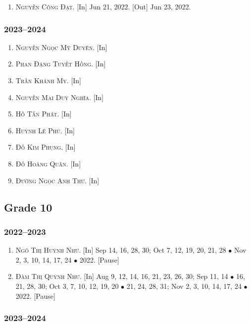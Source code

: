 \documentclass{article}
\begin{document}
\begin{enumerate}
	\item \textsc{Nguyễn Công Đạt.} \textsf{[In]} Jun 21, 2022. \textsf{[Out]} Jun 23, 2022.
\end{enumerate}

\subsubsection{2023--2024}

\begin{enumerate}
	\item \textsc{Nguyễn Ngọc Mỹ Duyên.} \textsf{[In]} 
	\item \textsc{Phan Đặng Tuyết Hồng.} \textsf{[In]} 
	\item \textsc{Trần Khánh My.} \textsf{[In]} 
	\item \textsc{Nguyễn Mai Duy Nghĩa.} \textsf{[In]} 
	\item \textsc{Hồ Tấn Phát.} \textsf{[In]} 
	\item \textsc{Huỳnh Lê Phú.} \textsf{[In]} 
	\item \textsc{Đỗ Kim Phụng.} \textsf{[In]} 
	\item \textsc{Đỗ Hoàng Quân.} \textsf{[In]} 
	\item \textsc{Đường Ngọc Anh Thư.} \textsf{[In]} 
\end{enumerate}

\subsection{Grade 10}

\subsubsection{2022--2023}

\begin{enumerate}
	\item \textsc{Ngô Thị Huỳnh Như.} \textsf{[In]} Sep 14, 16, 28, 30; Oct 7, 12, 19, 20, 21, 28 $\bullet$ Nov 2, 3, 10, 14, 17, 24 $\bullet$ 2022. \textsf{[Pause]}
	\item \textsc{Đàm Thị Quỳnh Như.} \textsf{[In]} Aug 9, 12, 14, 16, 21, 23, 26, 30; Sep 11, 14 $\bullet$ 16, 21, 28, 30; Oct 3, 7, 10, 12, 19, 20 $\bullet$ 21, 24, 28, 31; Nov 2, 3, 10, 14, 17, 24 $\bullet$ 2022. \textsf{[Pause]}
\end{enumerate}

\subsubsection{2023--2024}
\end{document}
